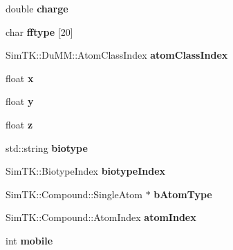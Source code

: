 \begin{DoxyCompactItemize}
\item 
double {\bfseries charge}\hypertarget{classbSpecificAtom_ac3612a41acc067ef812751e3255ce5cb}{}\label{classbSpecificAtom_ac3612a41acc067ef812751e3255ce5cb}

\item 
char {\bfseries fftype} \mbox{[}20\mbox{]}\hypertarget{classbSpecificAtom_ad45c98477fb0b2978d6d2e8ac0902f40}{}\label{classbSpecificAtom_ad45c98477fb0b2978d6d2e8ac0902f40}

\item 
Sim\+T\+K\+::\+Du\+M\+M\+::\+Atom\+Class\+Index {\bfseries atom\+Class\+Index}\hypertarget{classbSpecificAtom_a2f0b65ef893859f5d509d94df1473e1f}{}\label{classbSpecificAtom_a2f0b65ef893859f5d509d94df1473e1f}

\item 
float {\bfseries x}\hypertarget{classbSpecificAtom_abb7720f36b894771df4bd29c21862be9}{}\label{classbSpecificAtom_abb7720f36b894771df4bd29c21862be9}

\item 
float {\bfseries y}\hypertarget{classbSpecificAtom_aa77cdba47b688d19d79cb72a7c168959}{}\label{classbSpecificAtom_aa77cdba47b688d19d79cb72a7c168959}

\item 
float {\bfseries z}\hypertarget{classbSpecificAtom_a9a47470c406539191a6d48de31a16742}{}\label{classbSpecificAtom_a9a47470c406539191a6d48de31a16742}

\item 
std\+::string {\bfseries biotype}\hypertarget{classbSpecificAtom_abfdd749b7b82922098994dca0ff0dd21}{}\label{classbSpecificAtom_abfdd749b7b82922098994dca0ff0dd21}

\item 
Sim\+T\+K\+::\+Biotype\+Index {\bfseries biotype\+Index}\hypertarget{classbSpecificAtom_a271de778019be6dadf0eef099ad81f24}{}\label{classbSpecificAtom_a271de778019be6dadf0eef099ad81f24}

\item 
Sim\+T\+K\+::\+Compound\+::\+Single\+Atom $\ast$ {\bfseries b\+Atom\+Type}\hypertarget{classbSpecificAtom_a5ca58bcdd0e1c00b4a60c564348d7811}{}\label{classbSpecificAtom_a5ca58bcdd0e1c00b4a60c564348d7811}

\item 
Sim\+T\+K\+::\+Compound\+::\+Atom\+Index {\bfseries atom\+Index}\hypertarget{classbSpecificAtom_a45847ebb707a279af90208d9e57f1aaf}{}\label{classbSpecificAtom_a45847ebb707a279af90208d9e57f1aaf}

\item 
int {\bfseries mobile}\hypertarget{classbSpecificAtom_ae49799913450173cb8f34978d5907b17}{}\label{classbSpecificAtom_ae49799913450173cb8f34978d5907b17}


\end{DoxyCompactItemize}
